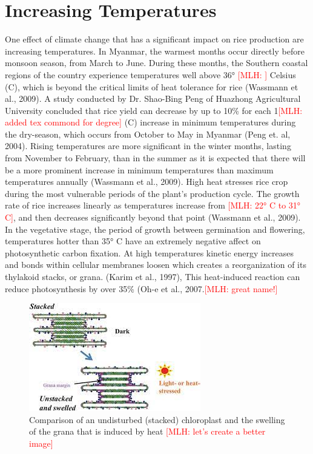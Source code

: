 \documentclass{book}\usepackage{knitr}
\newcommand{\red}[1]{\textcolor{red}{[MLH: #1]}}
\begin{document}
{\section{Increasing Temperatures}
One effect of climate change that has a significant impact on rice production are increasing temperatures. In Myanmar, the warmest months occur directly before monsoon season, from March to June. During these months, the Southern coastal regions of the country experience temperatures well above 36° \red{\degree} Celsius (C), which is beyond the critical limits of heat tolerance for rice (Wassmann et al., 2009). A study conducted by Dr. Shao-Bing Peng of Huazhong Agricultural University concluded that rice yield can decrease by up to 10\% for each 1\degree \red{added tex commond for degree} (C) increase in minimum temperatures during the dry-season, which occurs from October to May in Myanmar (Peng et. al, 2004). Rising temperatures are more significant in the winter months, lasting from November to February, than in the summer as it is expected that there will be a more prominent increase in minimum temperatures than maximum temperatures annually (Wassmann et al., 2009). 
High heat stresses rice crop during the most vulnerable periods of the plant’s production cycle. The growth rate of rice increases linearly as temperatures increase from \red{22° C to 31° C}, and then decreases significantly beyond that point (Wassmann et al., 2009). In the vegetative stage, the period of growth between germination and flowering, temperatures hotter than 35° C have an extremely negative affect on photosynthetic carbon fixation. At high temperatures kinetic energy increases and bonds within cellular membranes loosen which creates a reorganization of its thylakoid stacks, or grana. (Karim et al., 1997), This heat-induced reaction can reduce photosynthesis by over 35\% (Oh-e et al., 2007.\red{great name!}

\begin{figure}
\includegraphics[width=\linewidth]{images/myanmar/Image4.jpg}
\caption{Comparison of an undisturbed (stacked) chloroplast and the swelling of the grana that is induced by heat \red{let's create a better image}}
\end{figure}

}
\end{document}
